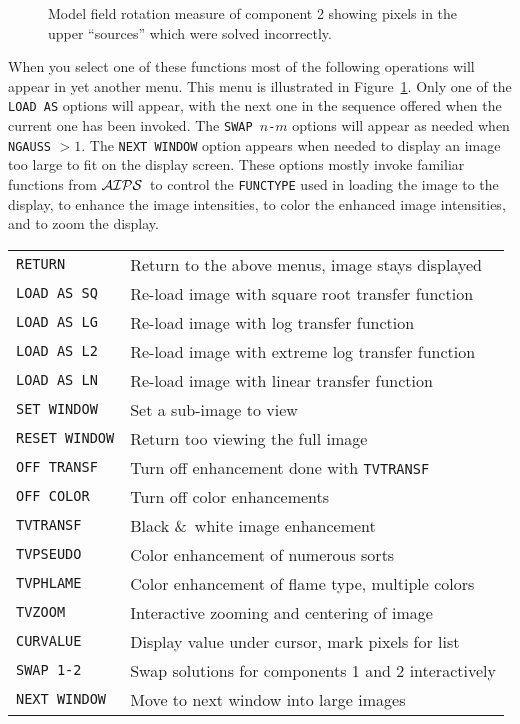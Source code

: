 \documentclass[twoside]{article}
\newcommand{\Hi}[1]{\textcolor{hicol}{#1}}
\newcommand{\AIPS}{{$\cal AIPS\/$}}
\newcommand{\putfig}[1]{\texttt{[image: \#1.eps]}}
\begin{document}
\begin{figure}
\begin{center}
\resizebox{6.0in}{!}{\putfig{RMFIT.badpix}}
\caption{Model field rotation measure of component 2 showing pixels in
the upper ``sources'' which were solved incorrectly.}
\label{fig:RMFIT.badpix}
\end{center}
\end{figure}

When you select one of these functions most of the following
operations will appear in yet another menu.  This menu is illustrated
in Figure~\ref{fig:RMFIT.badpix}.  Only one of the {\tt LOAD AS}
options will appear, with the next one in the sequence offered when
the current one has been invoked.  The {\tt SWAP $n$-$m$} options will
appear as needed when {\tt NGAUSS} $ > 1$.  The {\tt NEXT WINDOW}
option appears when needed to display an image too large to fit on the
display screen.  These options mostly invoke familiar functions from
\AIPS\ to control the {\tt FUNCTYPE} used in loading the image to the
display, to enhance the image intensities, to color the enhanced image
intensities, and to zoom the display.

\begin{center}
\begin{tabular}{|l|l|}\hline
 {\tt RETURN     } & Return to the above menus, image stays displayed\\
 {\tt LOAD AS SQ } & Re-load image with square root transfer function\\
 {\tt LOAD AS LG } & Re-load image with log transfer function\\
 {\tt LOAD AS L2 } & Re-load image with extreme log transfer function\\
 {\tt LOAD AS LN } & Re-load image with linear transfer function\\
\Hi{{\tt SET WINDOW}} & \Hi{Set a sub-image to view}\\
\Hi{{\tt RESET WINDOW}} & \Hi{Return too viewing the full image}\\
 {\tt OFF TRANSF } & Turn off enhancement done with {\tt TVTRANSF}\\
 {\tt OFF COLOR  } & Turn off color enhancements\\
 {\tt TVTRANSF   } & Black \&\ white image enhancement\\
 {\tt TVPSEUDO   } & Color enhancement of numerous sorts\\
 {\tt TVPHLAME   } & Color enhancement of flame type, multiple colors\\
 {\tt TVZOOM     } & Interactive zooming and centering of image\\
 {\tt CURVALUE   } & Display value under cursor, mark pixels for list\\
 {\tt SWAP 1-2   } & Swap solutions for components 1 and 2 interactively\\
 {\tt NEXT WINDOW} & Move to next window into large images\\ \hline
\end{tabular}
\end{center}
\end{document}
